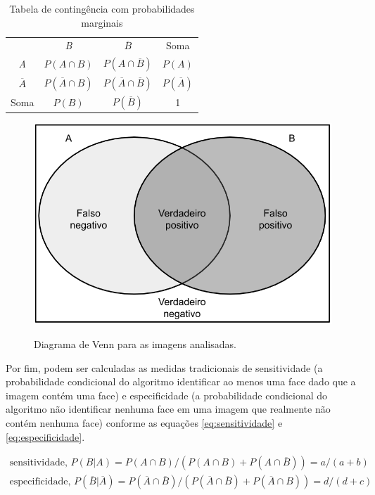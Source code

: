 \begin{table}[htbp]
    \caption{Tabela de contingência com probabilidades marginais}
    \label{tab:tabela_contingencia_probab}
    \centering
    \begin{tabular}{cccc}\hline\hline
        & \textit{B} & $\overline{B}$ & Soma\\
    \textit{A} & $P(A \cap B)$ & $P(A \cap \overline{B})$ & $P(A)$ \\
    $\overline{A}$ & $P(\overline{A} \cap B)$ & $P(\overline{A} \cap \overline{B})$ & $P(\overline{A})$ \\
    Soma & $P(B)$ & $P(\overline{B})$ & 1 \\
    \hline\hline
    \end{tabular}
\end{table}

 \begin{figure}[htbp]
     \centering
     \caption{Diagrama de Venn para as imagens analisadas.}
     \includegraphics[scale=.4]{figs/venn-diagram.png}
     \label{fig:venn_diagram}
  \end{figure}

Por fim, podem ser calculadas as medidas tradicionais de sensitividade (a probabilidade condicional do algoritmo identificar ao menos uma face dado que a imagem contém uma face) e especificidade (a probabilidade condicional do algoritmo não identificar nenhuma face em uma imagem que realmente não contém nenhuma face) conforme as equações \ref{eq:sensitividade} e \ref{eq:especificidade}.

\begin{align} \label{eq:sensitividade}
    \text{sensitividade, } P(B|A) = P(A \cap B) / (P(A \cap B) + P(A \cap \overline{B})) = a/(a + b) \\
    \label{eq:especificidade}
    \text{especificidade, } P(\overline{B} | \overline{A}) = P(\overline{A} \cap \overline{B}) / (P(\overline{A} \cap \overline{B}) + P(\overline{A} \cap B)) = d/(d + c)
\end{align}

